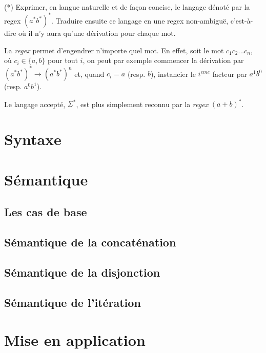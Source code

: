 \begin{exercice} (*)
Exprimer, en langue naturelle et de façon concise, le langage dénoté par la regex $(a^*b^*)^*$. Traduire ensuite ce langage en une regex non-ambiguë, c'est-à-dire où il n'y aura qu'une dérivation pour chaque mot.
\end{exercice}

\begin{correction*}
La \textit{regex} permet d'engendrer n'importe quel mot. En effet, soit le mot $c_1c_2...c_n$, où $c_i \in \{a,b\}$ pour tout $i$, on peut par exemple commencer la dérivation par $(a^*b^*)^* \rightarrow (a^*b^*)^n$ et, quand $c_i = a$ (resp. $b$), instancier le $i^{eme}$ facteur par $a^1b^0$ (resp. $a^0b^1$).

Le langage accepté, $\Sigma^*$, est plus simplement reconnu par la \textit{regex} $(a+b)^*$.
\end{correction*}

\section{Syntaxe}


\section{Sémantique}
\label{resem}

\subsection{Les cas de base}

\subsection{Sémantique de la concaténation}

\subsection{Sémantique de la disjonction}

\subsection{Sémantique de l'itération}


\section{Mise en application}

